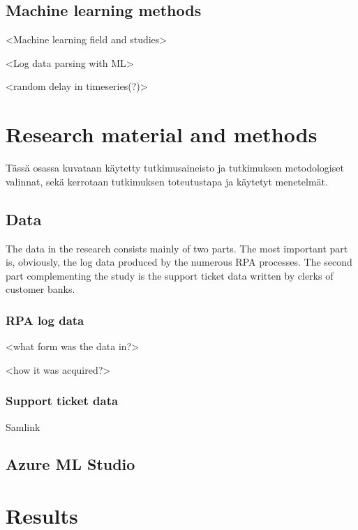 \documentclass[english, 12pt, a4paper, elec, utf8, a-1b, online]{aaltothesis}
\begin{document}
\subsection{Machine learning methods}
<Machine learning field and studies>

<Log data parsing with ML>

<random delay in timeseries(?)>

\clearpage

\section{Research material and methods}

Tässä osassa kuvataan käytetty tutkimusaineisto ja
tutkimuksen metodologiset valinnat, sekä
kerrotaan tutkimuksen toteutustapa ja käytetyt menetelmät. 

\subsection{Data}
The data in the research consists mainly of two parts.
The most important part is,
obviously,
the log data produced by the numerous RPA processes.
The second part complementing the study
is the support ticket data written by clerks of customer banks.

\subsubsection{RPA log data}
<what form was the data in?>

<how it was acquired?>

\subsubsection{Support ticket data}
Samlink

\subsection{Azure ML Studio}


\clearpage

\section{Results}
\end{document}
